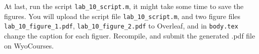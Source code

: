 At last, run the script \verb|lab_10_script.m|, it might take some time to save the figures. You will upload the script file \verb|lab_10_script.m|, and two figure files \verb|lab_10_figure_1.pdf|, \verb|lab_10_figure_2.pdf| to Overleaf, and in \verb|body.tex| change the caption for each figuer. Recompile, and submit the generated .pdf file on WyoCourses.
